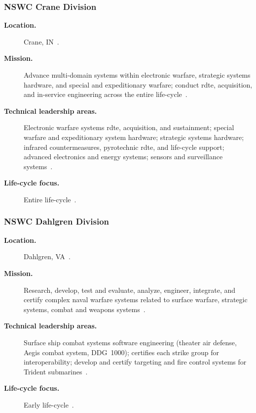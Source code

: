\documentclass[../main.tex]{subfiles}
\begin{document}
\subsubsection{NSWC Crane Division}
\begin{description}
  \item[\textbf{Location.}] Crane, IN~\autocite{edo-2-1-4-warfare-centers-2024}.
  \item[\textbf{Mission.}] Advance multi-domain systems within electronic warfare, strategic systems hardware, and special and expeditionary warfare; conduct \ac{rdte}, acquisition, and in-service engineering across the entire life-cycle~\autocite{edo-2-1-4-warfare-centers-2024}.
  \item[\textbf{Technical leadership areas.}] Electronic warfare systems \ac{rdte}, acquisition, and sustainment; special warfare and expeditionary system hardware; strategic systems hardware; infrared countermeasures, pyrotechnic \ac{rdte}, and life-cycle support; advanced electronics and energy systems; sensors and surveillance systems~\autocite{edo-2-1-4-warfare-centers-2024}.
  \item[\textbf{Life-cycle focus.}] Entire life-cycle~\autocite{edo-2-1-4-warfare-centers-2024}.
\end{description}

\subsubsection{NSWC Dahlgren Division}
\begin{description}
  \item[\textbf{Location.}] Dahlgren, VA~\autocite{edo-2-1-4-warfare-centers-2024}.
  \item[\textbf{Mission.}] Research, develop, test and evaluate, analyze, engineer, integrate, and certify complex naval warfare systems related to surface warfare, strategic systems, combat and weapons systems~\autocite{edo-2-1-4-warfare-centers-2024}.
  \item[\textbf{Technical leadership areas.}] Surface ship combat systems software engineering (theater air defense, Aegis combat system, DDG~1000); certifies each strike group for interoperability; develop and certify targeting and fire control systems for Trident submarines~\autocite{edo-2-1-4-warfare-centers-2024}.
  \item[\textbf{Life-cycle focus.}] Early life-cycle~\autocite{edo-2-1-4-warfare-centers-2024}.
\end{description}
\end{document}
